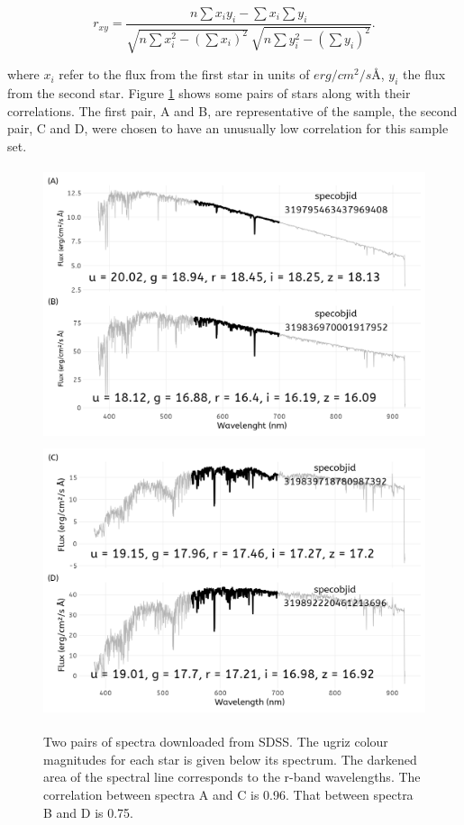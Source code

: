\documentclass[a4paper,fleqn,usenatbib]{mnras}
\begin{document}
\begin{equation}
  \displaystyle r_{xy}={\frac {n\sum x_{i}y_{i}-\sum x_{i}\sum y_{i}}{{\sqrt {n\sum x_{i}^{2}-\left(\sum x_{i}\right)^{2}}}~{\sqrt {n\sum y_{i}^{2}-\left(\sum y_{i}\right)^{2}}}}}.
  \label{eq:correlation}
\end{equation}

where \(x_i\) refer to the flux from the first star in units of
\(erg/cm^2/s Å\), \(y_i\) the flux from the second star. Figure
\ref{fig:spectra} shows some pairs of stars along with their
correlations. The first pair, A and B, are representative of the sample,
the second pair, C and D, were chosen to have an unusually low
correlation for this sample set.

\begin{figure}
  \includegraphics[width=\columnwidth, height = 8cm]{figures/spectra1}
  \includegraphics[width=\columnwidth, height = 8cm]{figures/spectra2}
    \caption{Two pairs of spectra downloaded from SDSS. The ugriz colour magnitudes for each star is given below its spectrum. The darkened area of the spectral line corresponds to the r-band wavelengths. The correlation between spectra A and C is 0.96. That between spectra B and D is 0.75.}
    \label{fig:spectra}
\end{figure}
\end{document}
